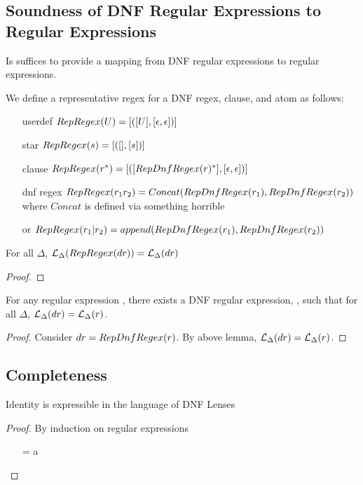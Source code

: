 \subsection{Soundness of DNF Regular Expressions to Regular Expressions}
Is suffices to provide a mapping from DNF regular expressions to regular
expressions.
\begin{definition}[RepRegex]
We define a representative regex for a DNF regex, clause, and atom as follows:
\begin{itemize}
\item[userdef] $RepRegex(U)=[([U],[\epsilon,\epsilon])]$
\item[star] $RepRegex(s)=[([],[s])]$
\item[clause] $RepRegex(r^*) = [([RepDnfRegex(r)^*],[\epsilon,\epsilon])]$
\item[dnf regex] $RepRegex(r_1r_2) = Concat(RepDnfRegex(r_1),RepDnfRegex(r_2))$ where $Concat$ is defined via something horrible
\item[or] $RepRegex(r_1|r_2) = append(RepDnfRegex(r_1),RepDnfRegex(r_2))$
\end{itemize}
\end{definition}

\begin{lemma}
For all $\Delta$, $\mathcal{L}_{\Delta}(RepRegex(dr)) = \mathcal{L}_{\Delta}(dr)$
\begin{proof}
\end{proof}
\end{lemma}

\begin{theorem}
For any regular expression \Regex{}, there exists a DNF regular expression, \DNFRegex{},
such that for all $\Delta$, $\mathcal{L}_{\Delta}(dr) = \mathcal{L}_{\Delta}(r)$.
\begin{proof}
Consider $dr=RepDnfRegex(r)$.  By above lemma, $\mathcal{L}_{\Delta}(dr)=\mathcal{L}_{\Delta}(r)$.
\end{proof}
\end{theorem}

\subsection{Completeness}
\begin{lemma}
Identity is expressible in the language of DNF Lenses
\begin{proof}
By induction on regular expressions
\begin{enumerate}
\item[\Regex=\UserDefined] a
\end{enumerate}
\end{proof}
\end{lemma}

